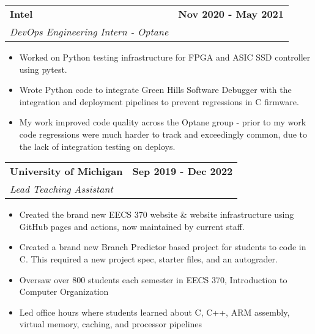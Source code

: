 \documentclass[11pt]{extreport}
\makeatletter
\newcommand{\resumeSubheading}[4]{
  \vspace{-1pt}
    \begin{tabular*}{1.0\textwidth}{l@{\extracolsep{\fill}}r}
      \textbf{#1} & \textbf{#2}  \vspace{1mm} \\
      {#3} & \textbf{#4} \\
    \end{tabular*}\vspace{-3pt}
}
\makeatother
\begin{document}
    \resumeSubheading{Intel}{Nov 2020 - May 2021}
    {\textit{DevOps Engineering Intern - Optane}}{}
    \vspace{-2mm}
    \begin{itemize}
    \item[\textperiodcentered] Worked on Python testing infrastructure for FPGA and ASIC SSD controller using pytest.
            \vspace{-2mm}

    \item[\textperiodcentered] Wrote Python code to integrate Green Hills Software Debugger with the integration and deployment pipelines to prevent regressions in C firmware. 
            \vspace{-2mm}

    \item[\textperiodcentered] My work 
 improved code quality across the Optane group - prior to my work code regressions were much harder to track and exceedingly common, due to the lack of integration testing on deploys.
    \end{itemize}
    
    \resumeSubheading{University of Michigan}{Sep 2019 - Dec 2022}
    {\textit{Lead Teaching Assistant}}{}
        \vspace{-2mm}
    \begin{itemize}
    \item[\textperiodcentered] Created the brand new EECS 370 website \& website infrastructure using GitHub pages and actions, now maintained by current staff.
        \vspace{-2mm}
    \item[\textperiodcentered] Created a brand new Branch Predictor based project for students to code in C. This required a new project spec, starter files, and an autograder.
        \vspace{-2mm}
    \item[\textperiodcentered] Oversaw over 800 students each semester in EECS 370, Introduction to Computer Organization
        \vspace{-2mm}
    \item[\textperiodcentered] Led office hours where students learned
    about C, C++, ARM assembly, virtual memory, caching, and processor pipelines
    \end{itemize}

\end{document}
